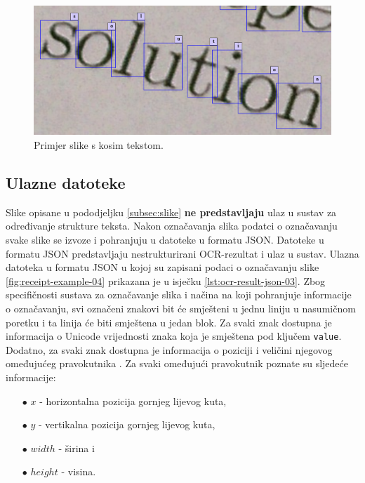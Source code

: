 \documentclass[times, utf8, zavrsni]{fer}
\begin{document}
\begin{figure}[htb]
    \centering
    \captionsetup{justification=centering,margin=2cm}
    \includegraphics[width=\textwidth]{images/book-example-04.png}
    \caption{Primjer slike s kosim tekstom.}
    \label{fig:book-example-04}
\end{figure}

\pagebreak




\subsection{Ulazne datoteke}
\label{subsec:ulazne-datoteke}
Slike opisane u pododjeljku \ref{subsec:slike} \textbf{ne predstavljaju} ulaz u sustav za određivanje strukture teksta. Nakon označavanja slika podatci o označavanju svake slike se izvoze i pohranjuju u datoteke u formatu JSON. Datoteke u formatu JSON predstavljaju nestrukturirani OCR-rezultat i ulaz u sustav. Ulazna datoteka u formatu JSON u kojoj su zapisani podaci o označavanju slike \ref{fig:receipt-example-04} prikazana je u isječku \ref{lst:ocr-result-json-03}. Zbog specifičnosti sustava za označavanje slika i načina na koji pohranjuje informacije o označavanju, svi označeni znakovi bit će smješteni u jednu liniju u nasumičnom poretku i ta linija će biti smještena u jedan blok. Za svaki znak dostupna je informacija o Unicode vrijednosti znaka koja je smještena pod ključem \lstinline{value}. Dodatno, za svaki znak dostupna je informacija o poziciji i veličini njegovog omeđujućeg pravokutnika . Za svaki omeđujući pravokutnik poznate su sljedeće informacije:

\begin{itemize}
    \item[$\bullet$] $x$ - horizontalna pozicija gornjeg lijevog kuta,
    \item[$\bullet$] $y$ - vertikalna pozicija gornjeg lijevog kuta,
    \item[$\bullet$] $width$ - širina i
    \item[$\bullet$] $height$ - visina.
\end{itemize}
\end{document}
